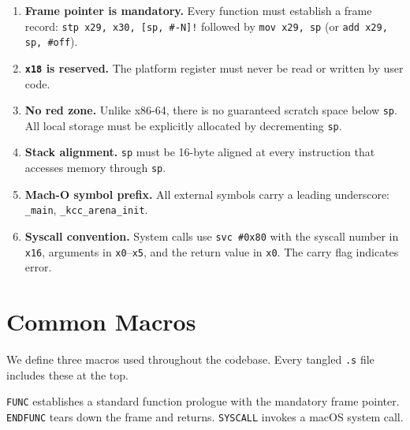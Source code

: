 \documentclass[11pt,a4paper,twoside,openright,DIV=15]{scrbook}
\theoremstyle{definition}
\theoremstyle{plain}
\theoremstyle{remark}
\newcommand{\reg}[1]{\texttt{#1}}
\begin{document}
\begin{enumerate}
\item \textbf{Frame pointer is mandatory.}  Every function must
      establish a frame record: \texttt{stp x29, x30, [sp, \#-N]!}
      followed by \texttt{mov x29, sp} (or \texttt{add x29, sp, \#off}).

\item \textbf{\reg{x18} is reserved.}  The platform register must
      never be read or written by user code.

\item \textbf{No red zone.}  Unlike x86-64, there is no guaranteed
      scratch space below \reg{sp}.  All local storage must be
      explicitly allocated by decrementing \reg{sp}.

\item \textbf{Stack alignment.}  \reg{sp} must be 16-byte aligned
      at every instruction that accesses memory through \reg{sp}.

\item \textbf{Mach-O symbol prefix.}  All external symbols carry
      a leading underscore: \texttt{\_main}, \texttt{\_kcc\_arena\_init}.

\item \textbf{Syscall convention.}  System calls use \texttt{svc \#0x80}
      with the syscall number in \reg{x16}, arguments in \reg{x0}--\reg{x5},
      and the return value in \reg{x0}.  The carry flag indicates error.
\end{enumerate}

\section{Common Macros}

We define three macros used throughout the codebase.  Every tangled
\texttt{.s} file includes these at the top.

\texttt{FUNC} establishes a standard function prologue with the
mandatory frame pointer.  \texttt{ENDFUNC} tears down the frame
and returns.  \texttt{SYSCALL} invokes a macOS system call.
\end{document}
